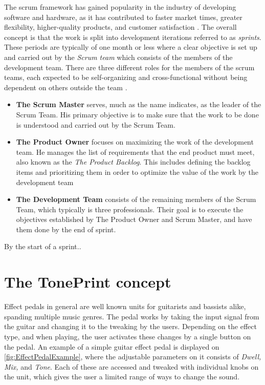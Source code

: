 \noindent
The scrum framework has gained popularity in the industry of developing software and hardware, as it has contributed to faster market times, greater flexibility, higher-quality products, and customer satisfaction \parencite[][40]{PDF:Scrum}. The overall concept is that the work is split into development iterations referred to as \textit{sprints}. These periods are typically of one month or less where a clear objective is set up and carried out by the \textit{Scrum team} which consists of the members of the development team. There are three different roles for the members of the scrum teams, each expected to be self-organizing and cross-functional without being dependent on others outside the team \parencite[][41]{PDF:Scrum}.
%
\begin{itemize}
	\item \textbf{The Scrum Master} serves, much as the name indicates, as the leader of the Scrum Team. His primary objective is to make sure that the work to be done is understood and carried out by the Scrum Team.
	\item \textbf{The Product Owner} focuses on maximizing the work of the development team. He manages the list of requirements that the end product must meet, also known as the \textit{The Product Backlog}. This includes defining the backlog items and prioritizing them in order to optimize the value of the work by the development team
	\item \textbf{The Development Team} consists of the remaining members of the Scrum Team, which typically is three professionals. Their goal is to execute the objectives established by The Product Owner and Scrum Master, and have them done by the end of sprint. 
\end{itemize}
%
By the start of a sprint..

\section{The TonePrint concept}
\label{TonePrintConceptDefined}
Effect pedals in general are well known units for guitarists and bassists alike, spanding multiple music genres. The pedal works by taking the input signal from the guitar and changing it to the tweaking by the users. Depending on the effect type, and when playing, the user activates these changes by a single button on the pedal. An example of a simple guitar effect pedal is displayed on \autoref{fig:EffectPedalExample}, where the adjustable parameters on it consists of \textit{Dwell, Mix,} and \textit{Tone}. Each of these are accessed and tweaked with individual knobs on the unit, which gives the user a limited range of ways to change the sound.


